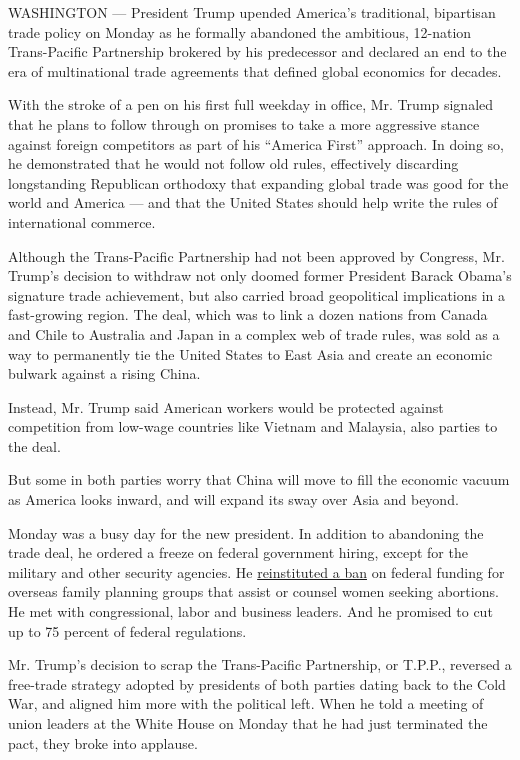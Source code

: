 WASHINGTON --- President Trump upended America's traditional, bipartisan
trade policy on Monday as he formally abandoned the ambitious, 12-nation
Trans-Pacific Partnership brokered by his predecessor and declared an
end to the era of multinational trade agreements that defined global
economics for decades.

With the stroke of a pen on his first full weekday in office, Mr. Trump
signaled that he plans to follow through on promises to take a more
aggressive stance against foreign competitors as part of his ``America
First'' approach. In doing so, he demonstrated that he would not follow
old rules, effectively discarding longstanding Republican orthodoxy that
expanding global trade was good for the world and America --- and that
the United States should help write the rules of international commerce.

Although the Trans-Pacific Partnership had not been approved by
Congress, Mr. Trump's decision to withdraw not only doomed former
President Barack Obama's signature trade achievement, but also carried
broad geopolitical implications in a fast-growing region. The deal,
which was to link a dozen nations from Canada and Chile to Australia and
Japan in a complex web of trade rules, was sold as a way to permanently
tie the United States to East Asia and create an economic bulwark
against a rising China.

Instead, Mr. Trump said American workers would be protected against
competition from low-wage countries like Vietnam and Malaysia, also
parties to the deal.

But some in both parties worry that China will move to fill the economic
vacuum as America looks inward, and will expand its sway over Asia and
beyond.

Monday was a busy day for the new president. In addition to abandoning
the trade deal, he ordered a freeze on federal government hiring, except
for the military and other security agencies. He
\href{https://www.nytimes3xbfgragh.onion/2017/01/23/world/trump-ban-foreign-aid-abortions.html}{reinstituted
a ban} on federal funding for overseas family planning groups that
assist or counsel women seeking abortions. He met with congressional,
labor and business leaders. And he promised to cut up to 75 percent of
federal regulations.

Mr. Trump's decision to scrap the Trans-Pacific Partnership, or T.P.P.,
reversed a free-trade strategy adopted by presidents of both parties
dating back to the Cold War, and aligned him more with the political
left. When he told a meeting of union leaders at the White House on
Monday that he had just terminated the pact, they broke into applause.

